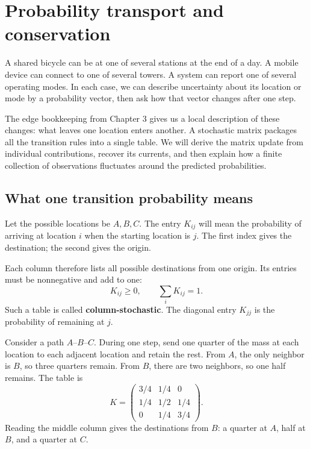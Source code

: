 \documentclass[11pt,oneside,openany]{book}
\theoremstyle{definition}
\theoremstyle{remark}
\numberwithin{equation}{chapter}
\begin{document}
\FloatBarrier

\chapter{Probability transport and conservation}
A shared bicycle can be at one of several stations at the end of a day. A mobile device can connect to one of several towers. A system can report one of several operating modes. In each case, we can describe uncertainty about its location or mode by a probability vector, then ask how that vector changes after one step.

The edge bookkeeping from Chapter 3 gives us a local description of these changes: what leaves one location enters another. A stochastic matrix packages all the transition rules into a single table. We will derive the matrix update from individual contributions, recover its currents, and then explain how a finite collection of observations fluctuates around the predicted probabilities.

\section{What one transition probability means}\label{ch04-what-one-transition-probability-means}

Let the possible locations be \(A,B,C\). The entry \(K_{ij}\) will mean the probability of arriving at location \(i\) when the starting location is \(j\). The first index gives the destination; the second gives the origin.

Each column therefore lists all possible destinations from one origin. Its entries must be nonnegative and add to one: \[K_{ij}\geq0,\qquad \sum_i K_{ij}=1.\] Such a table is called \textbf{column-stochastic}. The diagonal entry \(K_{jj}\) is the probability of remaining at \(j\).

Consider a path \(A\)--\(B\)--\(C\). During one step, send one quarter of the mass at each location to each adjacent location and retain the rest. From \(A\), the only neighbor is \(B\), so three quarters remain. From \(B\), there are two neighbors, so one half remains. The table is \[K=\begin{pmatrix}
3/4&1/4&0\\
1/4&1/2&1/4\\
0&1/4&3/4
\end{pmatrix}.\] Reading the middle column gives the destinations from \(B\): a quarter at \(A\), half at \(B\), and a quarter at \(C\).
\end{document}
